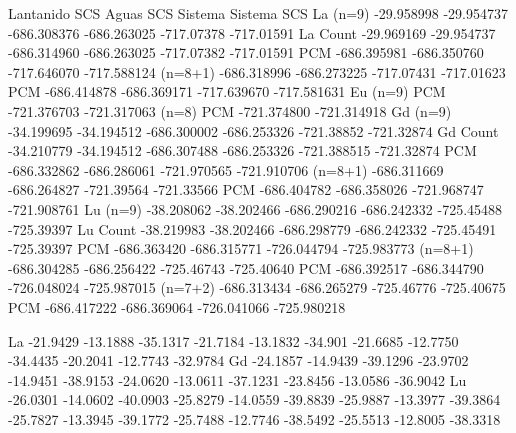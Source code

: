           Lantanido         SCS          Aguas           SCS           Sistema      Sistema SCS
La (n=9)  -29.958998      -29.954737    -686.308376      -686.263025  -717.07378    -717.01591
La Count  -29.969169      -29.954737    -686.314960      -686.263025  -717.07382    -717.01591
   PCM                                  -686.395981      -686.350760  -717.646070   -717.588124
   (n=8+1)                              -686.318996      -686.273225  -717.07431    -717.01623
   PCM                                  -686.414878      -686.369171  -717.639670   -717.581631
Eu (n=9)                                                                            
   PCM                                                                -721.376703   -721.317063
   (n=8)
   PCM                                                                -721.374800   -721.314918
Gd (n=9)  -34.199695      -34.194512    -686.300002      -686.253326  -721.38852    -721.32874
Gd Count  -34.210779      -34.194512    -686.307488      -686.253326  -721.388515   -721.32874
   PCM                                  -686.332862      -686.286061  -721.970565   -721.910706
   (n=8+1)                              -686.311669      -686.264827  -721.39564    -721.33566
   PCM                                  -686.404782      -686.358026  -721.968747   -721.908761
Lu (n=9)  -38.208062      -38.202466    -686.290216      -686.242332  -725.45488    -725.39397
Lu Count  -38.219983      -38.202466    -686.298779      -686.242332  -725.45491    -725.39397
   PCM                                  -686.363420      -686.315771  -726.044794   -725.983773
   (n=8+1)                              -686.304285      -686.256422  -725.46743    -725.40640
   PCM                                  -686.392517      -686.344790  -726.048024   -725.987015
   (n=7+2)                              -686.313434      -686.265279  -725.46776    -725.40675
   PCM                                  -686.417222      -686.369064  -726.041066   -725.980218

La -21.9429 -13.1888 -35.1317 -21.7184 -13.1832 -34.901
   -21.6685 -12.7750 -34.4435 -20.2041 -12.7743 -32.9784
Gd -24.1857 -14.9439 -39.1296 -23.9702 -14.9451 -38.9153
   -24.0620 -13.0611 -37.1231 -23.8456 -13.0586 -36.9042
Lu -26.0301 -14.0602 -40.0903 -25.8279 -14.0559 -39.8839
   -25.9887 -13.3977 -39.3864 -25.7827 -13.3945 -39.1772
   -25.7488 -12.7746 -38.5492 -25.5513 -12.8005 -38.3318
